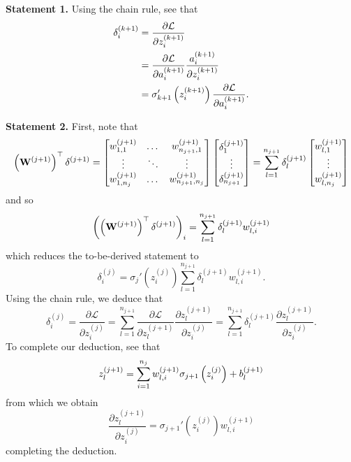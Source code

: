 \documentclass[11pt]{article}
\begin{document}
\noindent\textbf{Statement 1.} Using the chain rule, see that
\begin{align*}
    \delta_i^{(k+1)}
    &=
    \frac{\partial\mathcal{L}}{\partial z_i^{(k+1)}}\\
    &=
    \frac{\partial\mathcal{L}}{\partial a_i^{(k+1)}}\frac{a_i^{(k+1)}}{\partial z_i^{(k+1)}}\\
    &=
    \sigma_{k+1}'\left(z_i^{(k+1)}\right)\frac{\partial\mathcal{L}}{\partial a_i^{(k+1)}}.
\end{align*}

\noindent\textbf{Statement 2.} First, note that
$$
\left(\mathbf{W}^{(j+1)}\right)^\top\delta^{(j+1)}
=
\begin{bmatrix}
    w_{1,1}^{(j+1)}   & \dots  & w_{n_{j+1},1}^{(j+1)}\\
    \vdots            & \ddots & \vdots               \\
    w_{1,n_j}^{(j+1)} & \dots  & w_{n_{j+1},n_j}^{(j+1)}
\end{bmatrix}
\begin{bmatrix}
    \delta_1^{(j+1)}\\
    \vdots\\
    \delta_{n_{j+1}}^{(j+1)}
\end{bmatrix}
=
\sum_{l=1}^{n_{j+1}}\delta_l^{(j+1)}
\begin{bmatrix}
    w_{l,1}^{(j+1)}\\
    \vdots\\
    w_{l,n_j}^{(j+1)}
\end{bmatrix}
$$
and so
$$
\left(\left(\mathbf{W}^{(j+1)}\right)^\top\delta^{(j+1)}\right)_i
=
\sum_{l=1}^{n_{j+1}}\delta_l^{(j+1)}w_{l,i}^{(j+1)}
$$
which reduces the to-be-derived statement to
$$
\delta_i^{(j)}
=
\sigma_j'(z_i^{(j)})\sum_{l=1}^{n_{j+1}}\delta_l^{(j+1)}w_{l,i}^{(j+1)}.
$$
Using the chain rule, we deduce that
\begin{equation*}
    \label{eq:back_prop_statement_2}
    \delta_i^{(j)}
    =
    \frac{\partial\mathcal{L}}{\partial z_i^{(j)}}
    =
    \sum_{l=1}^{n_{j+1}}\frac{\partial\mathcal{L}}{\partial z_l^{(j+1)}}\frac{\partial z_l^{(j+1)}}{\partial z_i^{(j)}}
    =
    \sum_{l=1}^{n_{j+1}}\delta_l^{(j+1)}\frac{\partial z_l^{(j+1)}}{\partial z_i^{(j)}}.
\end{equation*}
To complete our deduction, see that
$$
z_l^{(j+1)}
=
\sum_{i=1}^{n_j}w_{l,i}^{(j+1)}\sigma_{j+1}\left(z_i^{(j)}\right)+b_l^{(j+1)}
$$
from which we obtain
$$
\frac{\partial z_l^{(j+1)}}{\partial z_i^{(j)}}
=
\sigma_{j+1}'(z_i^{(j)})w_{l,i}^{(j+1)}
$$
completing the deduction.
\end{document}
